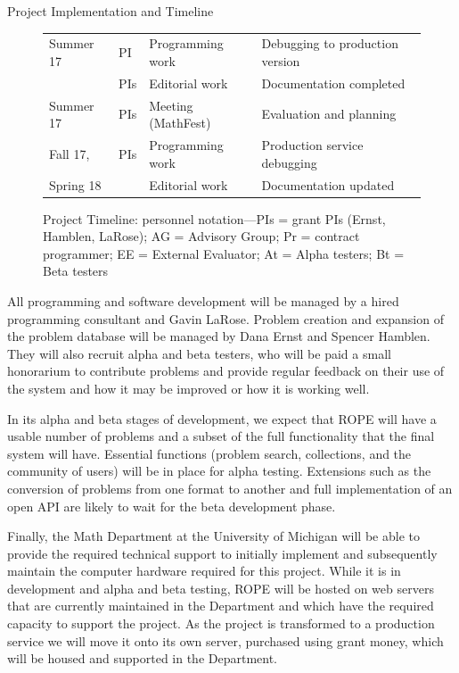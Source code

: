 \documentclass[11pt]{article}
\begin{document}
\begin{section}{Project Implementation and Timeline}
\begin{figure}
\begin{center}
\begin{tabular}{|l|l|l|l|}
  \hline
  Summer 17 & PI & Programming work & Debugging to
	production version \\ 
	& PIs & Editorial work & Documentation completed \\
  Summer 17 & PIs & Meeting (MathFest) & Evaluation and planning \\
  \hline
  Fall 17, & PIs & Programming work & Production service debugging\\
  Spring 18 & & Editorial work & Documentation updated \\ 
  \hline
\end{tabular}
\caption{Project Timeline: personnel notation---PIs = grant PIs (Ernst,
  Hamblen, LaRose); AG = Advisory Group; Pr = contract programmer; EE =
  External Evaluator; At = Alpha testers; Bt = Beta testers}
\label{timeline}
\end{center}
\end{figure}

All programming and software development will be managed by a hired
programming consultant and Gavin LaRose.  Problem creation and expansion
of the problem database will be managed by Dana Ernst and Spencer
Hamblen.  They will also recruit alpha and beta testers, who will be paid
a small honorarium to contribute problems and provide regular feedback on
their use of the system and how it may be improved or how it is working
well.

In its alpha and beta stages of development, we expect that ROPE will have
a usable number of problems and a subset of the full functionality that
the final system will have.  Essential functions (problem search,
collections, and the community of users) will be in place for alpha
testing.  Extensions such as the conversion of problems from one format to
another and full implementation of an
open API are likely to wait for the beta development phase.

Finally, the Math Department at the University of Michigan will be able to
provide the required technical support to initially implement and
subsequently maintain the computer hardware required for this project.
While it is in development and alpha and beta testing, ROPE will be
hosted on web servers that are currently maintained in the Department and
which have the required capacity to support the project.  As the
project is transformed to a production service we will move it onto its
own server, purchased using grant money, which will be housed and
supported in the Department.

\end{section}
\end{document}
